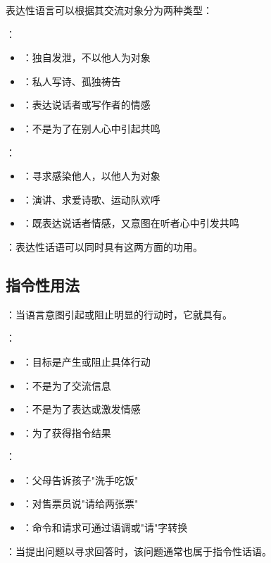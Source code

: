 \begin{theorembox}[title=表达的两种基本情形]
表达性语言可以根据其交流对象分为两种类型：

：
\begin{itemize}
  \item {}：独自发泄，不以他人为对象
  \item {}：私人写诗、孤独祷告
  \item {}：表达说话者或写作者的情感
  \item {}：不是为了在别人心中引起共鸣
\end{itemize}

：
\begin{itemize}
  \item {}：寻求感染他人，以他人为对象
  \item {}：演讲、求爱诗歌、运动队欢呼
  \item {}：既表达说话者情感，又意图在听者心中引发共鸣
\end{itemize}

：表达性话语可以同时具有这两方面的功用。
\end{theorembox}

\subsection{指令性用法}

\begin{theorembox}[title=指令性功能的定义与特征]
：当语言意图引起或阻止明显的行动时，它就具有。

：
\begin{itemize}
  \item {}：目标是产生或阻止具体行动
  \item {}：不是为了交流信息
  \item {}：不是为了表达或激发情感
  \item {}：为了获得指令结果
\end{itemize}
\end{theorembox}

\begin{examplebox}[title=指令性用法的典型例子]
：
\begin{itemize}
  \item {}：父母告诉孩子"洗手吃饭"
  \item {}：对售票员说"请给两张票"
  \item {}：命令和请求可通过语调或"请"字转换
\end{itemize}

：当提出问题以寻求回答时，该问题通常也属于指令性话语。
\end{examplebox}

